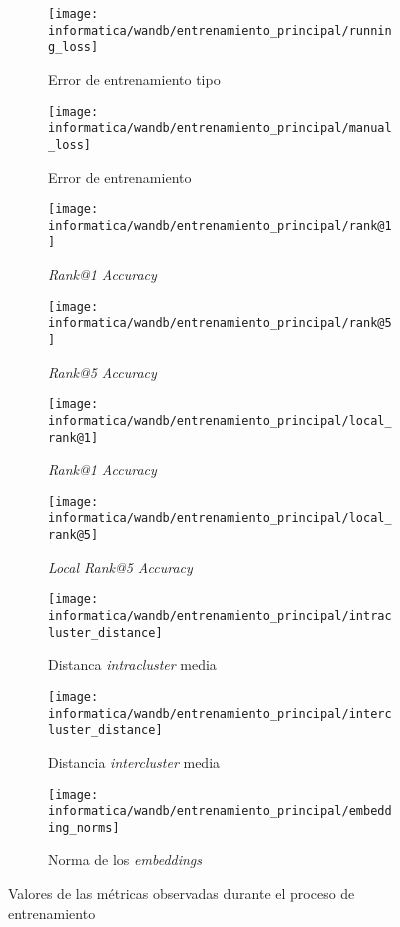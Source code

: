 \begin{figure}[!hbtp]

    \centering
    \begin{subfigure}[t]{0.45\textwidth}
        \texttt{[image: informatica/wandb/entrenamiento\_principal/running\_loss]}
        \caption{Error de entrenamiento tipo }
    \end{subfigure}
    \begin{subfigure}[t]{0.45\textwidth}
        \texttt{[image: informatica/wandb/entrenamiento\_principal/manual\_loss]}
        \caption{Error de entrenamiento}
    \end{subfigure}

    \begin{subfigure}[t]{0.45\textwidth}
        \texttt{[image: informatica/wandb/entrenamiento\_principal/rank@1]}
        \caption{\textit{Rank@1 Accuracy}}
    \end{subfigure}
    \begin{subfigure}[t]{0.45\textwidth}
        \texttt{[image: informatica/wandb/entrenamiento\_principal/rank@5]}
        \caption{\textit{Rank@5 Accuracy}}
    \end{subfigure}

    \begin{subfigure}[t]{0.45\textwidth}
        \texttt{[image: informatica/wandb/entrenamiento\_principal/local\_rank@1]}
        \caption{\textit{Rank@1 Accuracy}}
    \end{subfigure}
    \begin{subfigure}[t]{0.45\textwidth}
        \texttt{[image: informatica/wandb/entrenamiento\_principal/local\_rank@5]}
        \caption{\textit{Local Rank@5 Accuracy}}
    \end{subfigure}

    \begin{subfigure}[t]{0.45\textwidth}
        \texttt{[image: informatica/wandb/entrenamiento\_principal/intracluster\_distance]}
        \caption{Distanca \textit{intracluster} media}
    \end{subfigure}
    \begin{subfigure}[t]{0.45\textwidth}
        \texttt{[image: informatica/wandb/entrenamiento\_principal/intercluster\_distance]}
        \caption{Distancia \textit{intercluster} media}
    \end{subfigure}

    \begin{subfigure}[t]{0.45\textwidth}
        \texttt{[image: informatica/wandb/entrenamiento\_principal/embedding\_norms]}
        \caption{Norma de los \textit{embeddings}}
    \end{subfigure}

    \caption{Valores de las métricas observadas durante el proceso de entrenamiento}
    \label{img:metricas_entrenamiento}
\end{figure}

